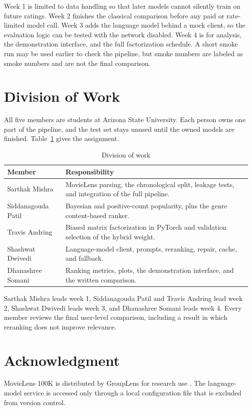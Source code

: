 \documentclass[conference]{IEEEtran}
\begin{document}
Week 1 is limited to data handling so that later models cannot silently train on future ratings. Week 2 finishes the classical comparison before any paid or rate-limited model call. Week 3 adds the language model behind a mock client, so the evaluation logic can be tested with the network disabled. Week 4 is for analysis, the demonstration interface, and the full factorization schedule. A short smoke run may be used earlier to check the pipeline, but smoke numbers are labeled as smoke numbers and are not the final comparison.

\section{Division of Work}
All five members are students at Arizona State University. Each person owns one part of the pipeline, and the test set stays unused until the owned models are finished. Table~\ref{tab:work} gives the assignment.

\begin{table}[t]
\caption{Division of work}
\label{tab:work}
\centering
\footnotesize
\begin{tabular}{@{}p{}p{}@{}}
\toprule
Member & Responsibility \\
\midrule
Sarthak Mishra & MovieLens parsing, the chronological split, leakage tests, and integration of the full pipeline. \\
Siddanagouda Patil & Bayesian and positive-count popularity, plus the genre content-based ranker. \\
Travis Andring & Biased matrix factorization in PyTorch and validation selection of the hybrid weight. \\
Shashwat Dwivedi & Language-model client, prompts, reranking, repair, cache, and fallback. \\
Dhanashree Somani & Ranking metrics, plots, the demonstration interface, and the written comparison. \\
\bottomrule
\end{tabular}
\end{table}

Sarthak Mishra leads week 1, Siddanagouda Patil and Travis Andring lead week 2, Shashwat Dwivedi leads week 3, and Dhanashree Somani leads week 4. Every member reviews the final user-level comparison, including a result in which reranking does not improve relevance.

\section*{Acknowledgment}
MovieLens 100K is distributed by GroupLens for research use \cite{harper2015}. The language-model service is accessed only through a local configuration file that is excluded from version control.
\end{document}
